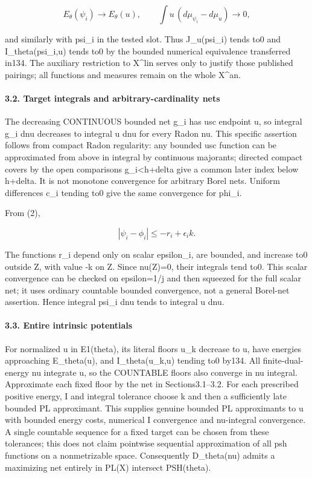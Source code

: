 \documentclass[
]{article}
\begin{document}
\[E_\theta(\psi_i)\to E_\theta(u),\qquad
\int u\,(d\mu_{\psi_i}-d\mu_u)\to0,\]

and similarly with psi\_i in the tested slot. Thus J\_u(psi\_i) tends
to0 and I\_theta(psi\_i,u) tends to0 by the bounded numerical
equivalence transferred in134. The auxiliary restriction to X\^{}lin
serves only to justify those published pairings; all functions and
measures remain on the whole X\^{}an.

\paragraph{3.2. Target integrals and arbitrary-cardinality
nets}\label{target-integrals-and-arbitrary-cardinality-nets}

The decreasing CONTINUOUS bounded net g\_i has usc endpoint u, so
integral g\_i dnu decreases to integral u dnu for every Radon nu. This
specific assertion follows from compact Radon regularity: any bounded
usc function can be approximated from above in integral by continuous
majorants; directed compact covers by the open comparisons
g\_i\textless h+delta give a common later index below h+delta. It is not
monotone convergence for arbitrary Borel nets. Uniform differences c\_i
tending to0 give the same convergence for phi\_i.

From (2),

\[|\psi_i-\phi_i|\leq-r_i+\epsilon_i k.\]

The functions r\_i depend only on scalar epsilon\_i, are bounded, and
increase to0 outside Z, with value -k on Z. Since nu(Z)=0, their
integrals tend to0. This scalar convergence can be checked on
epsilon=1/j and then squeezed for the full scalar net; it uses ordinary
countable bounded convergence, not a general Borel-net assertion. Hence
integral psi\_i dnu tends to integral u dnu.

\paragraph{3.3. Entire intrinsic
potentials}\label{entire-intrinsic-potentials}

For normalized u in E1(theta), its literal floors u\_k decrease to u,
have energies approaching E\_theta(u), and I\_theta(u\_k,u) tending to0
by134. All finite-dual-energy nu integrate u, so the COUNTABLE floors
also converge in nu integral. Approximate each fixed floor by the net in
Sections3.1--3.2. For each prescribed positive energy, I and integral
tolerance choose k and then a sufficiently late bounded PL approximant.
This supplies genuine bounded PL approximants to u with bounded energy
costs, numerical I convergence and nu-integral convergence. A single
countable sequence for a fixed target can be chosen from these
tolerances; this does not claim pointwise sequential approximation of
all psh functions on a nonmetrizable space. Consequently D\_theta(nu)
admits a maximizing net entirely in PL(X) intersect PSH(theta).
\end{document}
